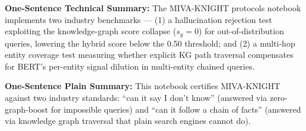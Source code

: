 \documentclass[12pt,a4paper]{article}
\theoremstyle{definition}
\theoremstyle{plain}
\theoremstyle{remark}
\begin{document}
\vfill

\begin{tcolorbox}[techbox]
\textbf{One-Sentence Technical Summary:}
The MIVA-KNIGHT protocols notebook implements two industry benchmarks ---
(1) a hallucination rejection test exploiting the knowledge-graph score
collapse ($s_g=0$) for out-of-distribution queries, lowering the hybrid
score below the 0.50 threshold; and (2) a multi-hop entity coverage test
measuring whether explicit KG path traversal compensates for BERT's
per-entity signal dilution in multi-entity chained queries.
\end{tcolorbox}

\begin{tcolorbox}[laymanbox]
\textbf{One-Sentence Plain Summary:}
This notebook certifies MIVA-KNIGHT against two industry standards:
``can it say I don't know'' (answered via zero-graph-boost for impossible
queries) and ``can it follow a chain of facts'' (answered via knowledge
graph traversal that plain search engines cannot do).
\end{tcolorbox}
\end{document}
